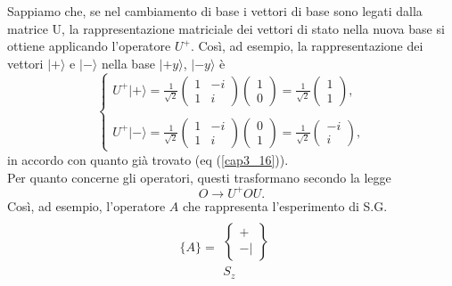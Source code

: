Sappiamo che, se nel cambiamento di base i vettori di base sono legati dalla matrice U, la rappresentazione matriciale dei vettori di stato nella nuova base si ottiene applicando l'operatore $U^+$. Così, ad esempio, la rappresentazione dei vettori $| + \rangle $ e $| - \rangle $ nella base  $| +y \rangle $, $| -y \rangle $ è
	\begin{equation}
		\begin{cases}
		\displaystyle{U^+| + \rangle =\frac{1}{\sqrt{2}}
		\begin{pmatrix}
		1 & -i\\
		1 & i
		\end{pmatrix}
		\begin{pmatrix}
		1\\
		0
		\end{pmatrix}=
		\frac{1}{\sqrt{2}}
		\begin{pmatrix}
		1\\
		1
		\end{pmatrix} ,}\\
		\\
		\displaystyle{U^+| - \rangle =\frac{1}{\sqrt{2}}
		\begin{pmatrix}
		1 & -i\\
		1 & i
		\end{pmatrix}
		\begin{pmatrix}
		0\\
		1
		\end{pmatrix}=
		\frac{1}{\sqrt{2}}
		\begin{pmatrix}
		-i\\
		i
		\end{pmatrix} ,}
		\end{cases}
	\end{equation}
in accordo con quanto già trovato (eq (\ref{cap3_16})).\\

Per quanto concerne gli operatori, questi trasformano secondo la legge
	\begin{equation}
		\boxed{
			O \rightarrow U^+OU .
			}
	\end{equation}
Così, ad esempio, l'operatore $A$ che rappresenta l'esperimento di S.G.
	\begin{equation}
		\bigg\lbrace A\bigg\rbrace =
		\begin{matrix}
		\
		\\[0.25cm]
		\begin{Bmatrix}
		 +  \\ - |  
		\end{Bmatrix} \\[0.5cm]
		S_z&
		\end{matrix}
	\end{equation}

